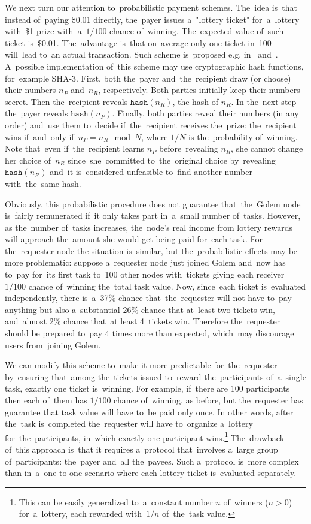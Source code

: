 \documentclass[a4paper]{article}
\newcommand{\hash}[1]{\mathtt{hash}({#1})}
\begin{document}
    We next turn our attention to~probabilistic payment schemes. The~idea  is~that instead of~paying \$0.01 directly,
    the~payer issues a~"lottery ticket" for~a~lottery with~\$1 prize with~a~$1/100$ chance of~winning. The~expected
    value of~such ticket is~\$0.01. The~advantage is~that on~average only one ticket in~100 will~lead to~an actual
    transaction. Such scheme is~proposed e.g. in~\cite{RIVEST} and~\cite{WHEELER}.
    A~possible implementation of~this scheme may use cryptographic hash functions, for~example SHA-3. First, both
    the~payer and~the~recipient draw (or choose) their numbers $n_P$ and~$n_R$, respectively.
    Both parties initially keep their numbers secret. Then the~recipient reveals $\hash{n_R}$, the hash of $n_R$.
    In the~next step the~payer reveals $\hash{n_P}$. Finally, both parties reveal their numbers (in any order)
    and~use them to~decide if~the~recipient receives the~prize: the~recipient wins if~and~only if~$n_P = n_R \mod N$,
    where $1/N$ is 
    the~probability of~winning. Note that~even if~the~recipient learns $n_P$ before~revealing $n_R$, she cannot change
    her choice of~$n_R$ since~she~committed to~the~original choice by~revealing $\hash{n_R}$ and~it is~considered
    unfeasible to~find another number with~the~same hash.

    Obviously, this probabilistic procedure does not guarantee that~the~Golem node is~fairly remunerated if~it only
    takes part in~a~small number of~tasks. However, as the~number of~tasks increases, the~node's real income from
    lottery rewards will approach the~amount she would get being paid for~each task. For the~requester node the
    situation is~similar, but the~probabilistic effects may be more problematic: suppose a~requester node just
    joined Golem and~now has to~pay for~its first task to~100 other nodes with~tickets giving each receiver
    $1/100$ chance of~winning the~total task value. Now, since~each ticket is~evaluated independently,
    there is~a~37\% chance that~the~requester will not have to~pay anything but also a~substantial 26\% chance that
    at~least two tickets win, and~almost 2\% chance that~at least 4~tickets win. Therefore the~requester should be
    prepared to~pay 4 times more than expected, which~may discourage users from~joining Golem.

    We can modify this scheme to~make it more predictable for~the~requester by~ensuring that~among the~tickets issued
    to~reward the~participants of~a~single task, exactly one ticket is~winning. For example, if~there are 100
    participants then each of~them has $1/100$ chance of~winning, as before, but the~requester has guarantee that
    task value will have to~be paid only once. In other words, after the~task is~completed the~requester will have
    to~organize a~lottery for~the~participants, in~which exactly one participant wins.\footnote{This can be easily
    generalized to~a~constant number $n$ of~winners ($n > 0$) for~a~lottery, each rewarded with~$1/n$ of~the~task
    value.}
    The~drawback of~this approach is~that it requires a~protocol that~involves a~large group of~participants:
    the~payer and~all the~payees.
    Such a~protocol is~more complex than in~a~one-to-one scenario where each lottery ticket is~evaluated separately.
\end{document}
